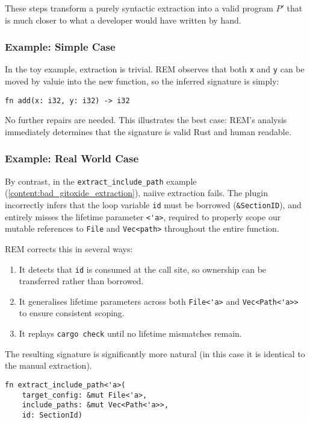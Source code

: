 These steps transform a purely syntactic extraction into a valid program $P'$ that is much closer to what a developer would have written by hand.

\subsubsection*{Example: Simple Case}

In the toy example, extraction is trivial. REM observes that both \verb|x| and \verb|y| can be moved by valuie into the new function, so the inferred signature is simply:

\begin{verbatim}
fn add(x: i32, y: i32) -> i32
\end{verbatim}

No further repairs are needed. This illustrates the best case: REM's analysis immediately determines that the signature is valid Rust and human readable.

\subsubsection*{Example: Real World Case}

By contrast, in the \verb|extract_include_path| example
(\ref{content:bad_gitoxide_extraction}), naiive extraction fails. The plugin
incorrectly infers that the loop variable \verb|id| must be borrowed
(\verb|&SectionID|), and entirely misses the lifetime parameter \verb|<'a>|,
required to properly scope our mutable references to \verb|File| and
\verb|Vec<path>| throughout the entire function.

REM corrects this in several ways:
\begin{enumerate}
    \item It detects that \verb|id| is consumed at the call site, so ownership
    can be transferred rather than borrowed.
    \item It generalises lifetime parameters across both \verb|File<'a>| and
    \verb|Vec<Path<'a>>| to ensure consistent scoping.
    \item It replays \verb|cargo check| until no lifetime mismatches remain.
\end{enumerate}

The resulting signature is significantly more natural (in this case it is
identical to the manual extraction).

\begin{verbatim}
fn extract_include_path<'a>(
    target_config: &mut File<'a>,
    include_paths: &mut Vec<Path<'a>>,
    id: SectionId)
\end{verbatim}

